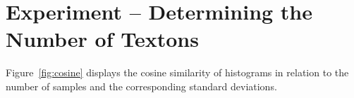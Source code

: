 \section{Experiment -- Determining the Number of Textons}

Figure~\ref{fig:cosine} displays the cosine similarity of histograms
in relation to the number of samples and the corresponding standard
deviations.